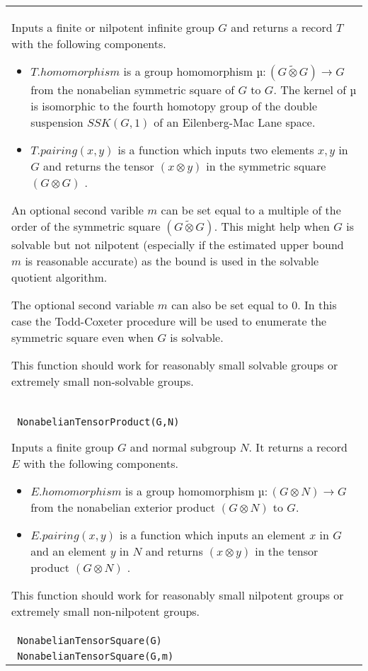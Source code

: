 \documentclass[a4paper,11pt]{report}
\begin{document}
{\begin{center}
\begin{tabular}{|l|}
 Inputs a finite or nilpotent infinite group $G$ and returns a record $T$ with the following components. 
\begin{itemize}
\item  $T.homomorphism$ is a group homomorphism $µ : (G \tilde\otimes G) \longrightarrow G$ from the nonabelian symmetric square of $G$ to $G$. The kernel of $µ$ is isomorphic to the fourth homotopy group of the double suspension $SSK(G,1)$ of an Eilenberg-Mac Lane space. 
\item  $T.pairing(x,y)$ is a function which inputs two elements $x, y$ in $G$ and returns the tensor $(x \otimes y)$ in the symmetric square $(G \otimes G)$ . 
\end{itemize}
 An optional second varible $m$ can be set equal to a multiple of the order of the symmetric square $(G \tilde\otimes G)$. This might help when $G$ is solvable but not nilpotent (especially if the estimated upper bound $m$ is reasonable accurate) as the bound is used in the solvable quotient
algorithm. 

 The optional second variable $m$ can also be set equal to $0$. In this case the Todd-Coxeter procedure will be used to enumerate the
symmetric square even when $G$ is solvable. 

 This function should work for reasonably small solvable groups or extremely
small non-solvable groups. \\
 \index{NonabelianTensorProduct} \texttt{ NonabelianTensorProduct(G,N) } 

 Inputs a finite group $G$ and normal subgroup $N$. It returns a record $E$ with the following components. 
\begin{itemize}
\item  $E.homomorphism$ is a group homomorphism $µ : (G \otimes N ) \longrightarrow G$ from the nonabelian exterior product $(G \otimes N)$ to $G$. 
\item  $E.pairing(x,y)$ is a function which inputs an element $x$ in $G$ and an element $y$ in $N$ and returns $(x \otimes y)$ in the tensor product $(G \otimes N)$ . 
\end{itemize}
 This function should work for reasonably small nilpotent groups or extremely
small non-nilpotent groups. \\
 \index{NonabelianTensorSquare} \texttt{ NonabelianTensorSquare(G) } \\
 \texttt{ NonabelianTensorSquare(G,m) } 


\end{tabular}
\end{center}}
\end{document}
